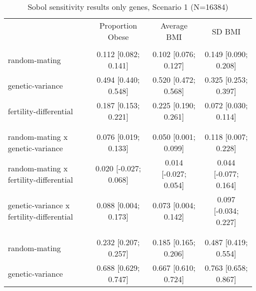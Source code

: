 
    \begin{table}[htp]
    \renewcommand{\arraystretch}{1.3}
    \setlength{\tabcolsep}{5pt}
    \caption{Sobol sensitivity results only genes, Scenario 1 (N=16384)}
    \label{tab:sobol-snp}
    \footnotesize
    \centering
    \begin{threeparttable}
    \begin{tabular}{lccc}
    \hline
    \addlinespace
    & Proportion Obese & Average BMI & SD BMI \\
    \addlinespace
    \hline
    \addlinespace[6pt]
    \multicolumn{4}{l}{\hspace{1em} S1} \\
\hspace{1.5em} random-mating & 0.112 [0.082; 0.141]   & 0.102 [0.076; 0.127]   & 0.149 [0.090; 0.208] \\
	  \hspace{1.5em} genetic-variance & 0.494 [0.440; 0.548]   & 0.520 [0.472; 0.568]   & 0.325 [0.253; 0.397] \\
	  \hspace{1.5em} fertility-differential & 0.187 [0.153; 0.221]   & 0.225 [0.190; 0.261]   & 0.072 [0.030; 0.114] \\
	 \\
    \addlinespace[12pt]
    \multicolumn{4}{l}{\hspace{1em} S2} \\ 
\hspace{1.5em} random-mating x genetic-variance & 0.076 [0.019; 0.133]   & 0.050 [0.001; 0.099]   & 0.118 [0.007; 0.228] \\
	  \hspace{1.5em} random-mating x fertility-differential & 0.020 [-0.027; 0.068]   & 0.014 [-0.027; 0.054]   & 0.044 [-0.077; 0.164] \\
	  \hspace{1.5em} genetic-variance x fertility-differential & 0.088 [0.004; 0.173]   & 0.073 [0.004; 0.142]   & 0.097 [-0.034; 0.227] \\
	 \\
    \addlinespace[12pt]
    \multicolumn{4}{l}{\hspace{1em} ST} \\ 
\hspace{1.5em} random-mating & 0.232 [0.207; 0.257]   & 0.185 [0.165; 0.206]   & 0.487 [0.419; 0.554] \\
	  \hspace{1.5em} genetic-variance & 0.688 [0.629; 0.747]   & 0.667 [0.610; 0.724]   & 0.763 [0.658; 0.867] \\

\end{tabular}
\end{threeparttable}
\end{table}
